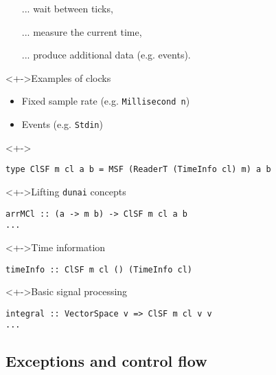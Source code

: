 \documentclass{enigtex-beamer-base}
\begin{document}
\begin{frame}[fragile]
\begin{itemize}
	\item[...] wait between ticks,
	\item[...] measure the current time,
	\item[...] produce additional data (e.g. events).
\end{itemize}

\begin{block}<+->{Examples of clocks}
\begin{itemize}
	\item Fixed sample rate (e.g. \texttt{Millisecond n})
	\item Events (e.g. \texttt{Stdin})
\end{itemize}
\end{block}
\end{frame}


\begin{frame}[fragile]
\begin{block}<+->{}
\begin{verbatim}
type ClSF m cl a b = MSF (ReaderT (TimeInfo cl) m) a b
\end{verbatim}
\end{block}
\begin{block}<+->{Lifting \texttt{dunai} concepts}
\begin{verbatim}
arrMCl :: (a -> m b) -> ClSF m cl a b
...
\end{verbatim}
\end{block}
\begin{block}<+->{Time information}
\begin{verbatim}
timeInfo :: ClSF m cl () (TimeInfo cl)
\end{verbatim}
\end{block}
\begin{block}<+->{Basic signal processing}
\begin{verbatim}
integral :: VectorSpace v => ClSF m cl v v
...
\end{verbatim}
\end{block}
\end{frame}

\subsection{Exceptions and control flow}
\end{document}
